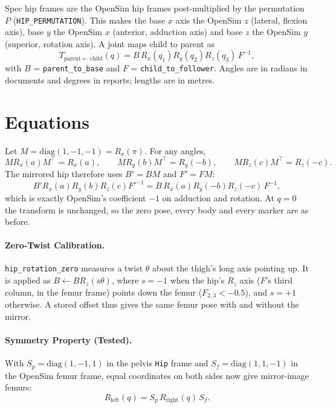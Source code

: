\documentclass[11pt]{article}
\begin{document}
Spec hip frames are the OpenSim hip frames post-multiplied by the permutation
$P$ (\texttt{HIP\_PERMUTATION}). This makes the base $x$ axis the OpenSim $z$
(lateral, flexion axis), base $y$ the OpenSim $x$ (anterior, adduction axis)
and base $z$ the OpenSim $y$ (superior, rotation axis). A joint maps child to
parent as
\begin{equation}
  T_{\mathrm{parent}\leftarrow\mathrm{child}}(q) =
  B \, R_x(q_1) R_y(q_2) R_z(q_3) \, F^{-1},
\end{equation}
with $B$ = \texttt{parent\_to\_base} and $F$ = \texttt{child\_to\_follower}.
Angles are in radians in documents and degrees in reports; lengths are in
metres.

\section{Equations}

Let $M = \mathrm{diag}(1,-1,-1) = R_x(\pi)$. For any angles,
\begin{equation}
  M R_x(a) M^{\top} = R_x(a), \qquad
  M R_y(b) M^{\top} = R_y(-b), \qquad
  M R_z(c) M^{\top} = R_z(-c).
\end{equation}
The mirrored hip therefore uses $B' = BM$ and $F' = FM$:
\begin{equation}
  B' R_x(a) R_y(b) R_z(c) F'^{-1}
  = B \, R_x(a) R_y(-b) R_z(-c) \, F^{-1},
\end{equation}
which is exactly OpenSim's coefficient $-1$ on adduction and rotation. At
$q = 0$ the transform is unchanged, so the zero pose, every body and every
marker are as before.

\paragraph{Zero-Twist Calibration.} \texttt{hip\_rotation\_zero} measures a
twist $\theta$ about the thigh's long axis pointing up. It is applied as
$B \leftarrow B R_z(s\theta)$, where $s = -1$ when the hip's $R_z$ axis
($F$'s third column, in the femur frame) points down the femur
($F_{2,3} < -0.5$), and $s = +1$ otherwise. A stored offset thus gives the
same femur pose with and without the mirror.

\paragraph{Symmetry Property (Tested).} With $S_p = \mathrm{diag}(1,-1,1)$ in
the pelvis \texttt{Hip} frame and $S_f = \mathrm{diag}(1,1,-1)$ in the
OpenSim femur frame, equal coordinates on both sides now give mirror-image
femurs:
\begin{equation}
  R_{\mathrm{left}}(q) = S_p \, R_{\mathrm{right}}(q) \, S_f .
\end{equation}
\end{document}
